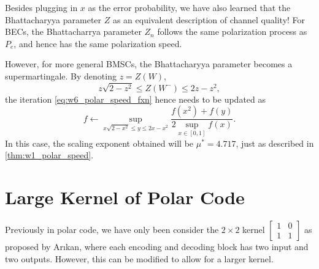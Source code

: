 \begin{remark}
    Besides plugging in $x$ as the error probability, we have also learned that the Bhattacharyya parameter $Z$ as an equivalent description of channel quality! For BECs, the Bhattacharrya parameter $Z_n$ follows the same polarization process as $P_e$, and hence has the same polarization speed. 
    
    However, for more general BMSCs, the Bhattacharyya parameter becomes a supermartingale. By denoting $z=Z(W)$,
    \begin{equation}
        z\sqrt{2-z^2} \le Z(W^-) \le 2z-z^2,
    \end{equation}
    the iteration \autoref{eq:w6_polar_speed_fxn} hence needs to be updated as
    \begin{equation}
        f \leftarrow \sup_{x\sqrt{2-x^2} \le y \le 2x-x^2} \frac{f(x^2)+f(y)}{2\sup_{x\in[0,1]}f(x)}.
    \end{equation}
    In this case, the scaling exponent obtained will be $\mu^*=4.717$, just as described in \autoref{thm:w1_polar_speed}.
\end{remark}

\section{Large Kernel of Polar Code}
Previously in polar code, we have only been consider the $2\times 2$ kernel $\left[\begin{matrix}
    1 & 0 \\ 1 & 1
\end{matrix}\right]$ as proposed by Ar{\i}kan, where each encoding and decoding block has two input and two outputs. However, this can be modified to allow for a larger kernel.

